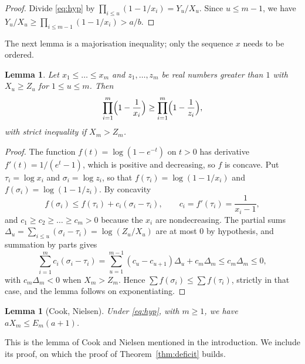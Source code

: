 \documentclass[11pt,reqno]{amsart}
\numberwithin{equation}{section}
\theoremstyle{plain}
\newtheorem{lemma}[theorem]{Lemma}
\theoremstyle{definition}
\theoremstyle{remark}
\begin{document}
\begin{proof}
Divide \eqref{eq:hyp} by $\prod_{i\le u}(1-1/x_i)=Y_u/X_u$. Since
$u\le m-1$, we have $Y_u/X_u\ge\prod_{i\le m-1}(1-1/x_i)>a/b$.
\end{proof}

The next lemma is a majorisation inequality; only the sequence $x$
needs to be ordered.

\begin{lemma}\label{lem:major}
Let $x_1\le\dots\le x_m$ and $z_1,\dots,z_m$ be real numbers greater
than $1$ with $X_u\ge Z_u$ for $1\le u\le m$. Then
\[
  \prod_{i=1}^{m}\Bigl(1-\frac1{x_i}\Bigr)\ge
  \prod_{i=1}^{m}\Bigl(1-\frac1{z_i}\Bigr),
\]
with strict inequality if $X_m>Z_m$.
\end{lemma}

\begin{proof}
The function $f(t)=\log(1-e^{-t})$ on $t>0$ has derivative
$f'(t)=1/(e^t-1)$, which is positive and decreasing, so $f$ is
concave. Put $\tau_i=\log x_i$ and $\sigma_i=\log z_i$, so that
$f(\tau_i)=\log(1-1/x_i)$ and $f(\sigma_i)=\log(1-1/z_i)$. By
concavity
\[
  f(\sigma_i)\le f(\tau_i)+c_i(\sigma_i-\tau_i),\qquad
  c_i=f'(\tau_i)=\frac1{x_i-1},
\]
and $c_1\ge c_2\ge\dots\ge c_m>0$ because the $x_i$ are
nondecreasing. The partial sums
$\Delta_u=\sum_{i\le u}(\sigma_i-\tau_i)=\log(Z_u/X_u)$ are at most
$0$ by hypothesis, and summation by parts gives
\[
  \sum_{i=1}^{m}c_i(\sigma_i-\tau_i)
  =\sum_{u=1}^{m-1}(c_u-c_{u+1})\Delta_u+c_m\Delta_m
  \le c_m\Delta_m\le0 ,
\]
with $c_m\Delta_m<0$ when $X_m>Z_m$. Hence
$\sum f(\sigma_i)\le\sum f(\tau_i)$, strictly in that case, and the
lemma follows on exponentiating.
\end{proof}

\begin{lemma}[Cook, Nielsen]\label{lem:cn}
Under \eqref{eq:hyp}, with $m\ge1$, we have $aX_m\le E_m(a+1)$.
\end{lemma}

This is the lemma of Cook \cite{Coo99} and Nielsen \cite{Nie03}
mentioned in the introduction. We include its proof, on which the
proof of Theorem~\ref{thm:deficit} builds.
\end{document}

